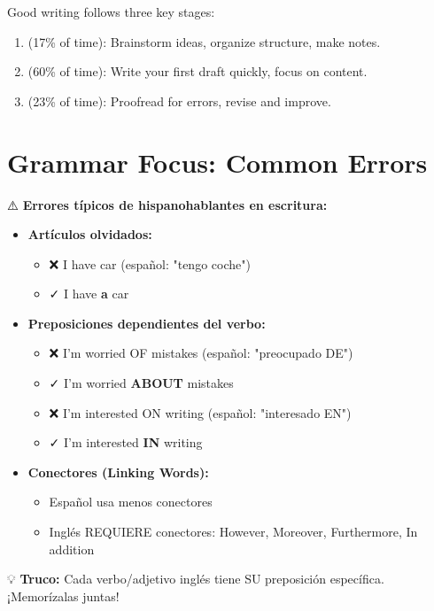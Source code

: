 Good writing follows three key stages:

\begin{vocabbox}[title=The 3 Stages]
\begin{enumerate}
    \item {} (17\% of time): Brainstorm ideas, organize structure, make notes.
    \item {} (60\% of time): Write your first draft quickly, focus on content.
    \item {} (23\% of time): Proofread for errors, revise and improve.
\end{enumerate}
\end{vocabbox}

\section{Grammar Focus: Common Errors}

\begin{spanishbox}[title=Para Hispanohablantes: Common Spanish Speaker Errors]
⚠️ \textbf{Errores típicos de hispanohablantes en escritura:}

\begin{itemize}
    \item \textbf{Artículos olvidados:}
    \begin{itemize}
        \item ❌ I have car (español: "tengo coche")
        \item ✓ I have \textbf{a} car
    \end{itemize}
    \item \textbf{Preposiciones dependientes del verbo:}
    \begin{itemize}
        \item ❌ I'm worried OF mistakes (español: "preocupado DE")
        \item ✓ I'm worried \textbf{ABOUT} mistakes
        \item ❌ I'm interested ON writing (español: "interesado EN")
        \item ✓ I'm interested \textbf{IN} writing
    \end{itemize}
    \item \textbf{Conectores (Linking Words):}
    \begin{itemize}
        \item Español usa menos conectores
        \item Inglés REQUIERE conectores: However, Moreover, Furthermore, In addition
    \end{itemize}
\end{itemize}

💡 \textbf{Truco:} Cada verbo/adjetivo inglés tiene SU preposición específica. ¡Memorízalas juntas!
\end{spanishbox}

